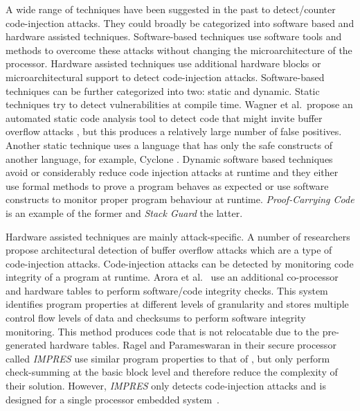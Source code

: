 \documentclass{article}
\begin{document}
A wide range of techniques have been suggested in the past to detect/counter code-injection attacks. They  could  broadly  be  categorized
into  software based and hardware assisted techniques. Software-based
techniques use software tools and methods  to  overcome these attacks
without changing the microarchitecture of the processor.     Hardware
assisted                 techniques use additional hardware blocks or
microarchitectural  support to
detect code-injection attacks. Software-based techniques can     be
further categorized into two: static and dynamic.    Static 
techniques  try to  detect vulnerabilities at compile  time.   Wagner
et al.\ propose an automated static code analysis tool to detect code
that might  invite buffer overflow attacks \cite{wagner00first},  but
this produces a relatively large number   of false positives. Another
static technique uses a language that has only the safe constructs of
another language, for example, Cyclone  \cite{jim02cyclone}.   Dynamic
software based techniques avoid or considerably reduce code injection
attacks at runtime and they either use formal methods to  prove     a
program  behaves  as  expected or use software  constructs to monitor
proper  program     behaviour at runtime. \emph{Proof-Carrying  Code}
\cite{necula97proofcarrying} is  an  example   of    the  former and
\emph{Stack Guard} \cite{cowan98stackguard} the latter.

Hardware assisted techniques are mainly attack-specific. A number of
researchers \cite{lee03enlisting,mcgregor03processor,xu02architecture}
propose  architectural detection of buffer overflow attacks which are
a type of code-injection     attacks. Code-injection attacks can be
detected by monitoring code integrity of a
program  at    runtime.   Arora  et al.\ \cite{arora05secure} use  an
additional co-processor and hardware tables to perform  software/code
integrity  checks. This       system identifies program properties at
different levels of      granularity  and stores multiple control flow
levels   of    data    and   checksums to perform  software integrity
monitoring. This method produces code that  is not relocatable due to
the pre-generated    hardware tables. Ragel and Parameswaran in their
secure processor called \emph{IMPRES} \cite{ragel06impres}        use
similar  program properties to that of \cite{arora05secure}, but only
perform  check-summing at the basic block level and therefore  reduce
the complexity of their solution. However, \emph{IMPRES} only detects
code-injection  attacks and is designed for a single processor embedded
system~\cite{ragel2006architectural}.
\end{document}
